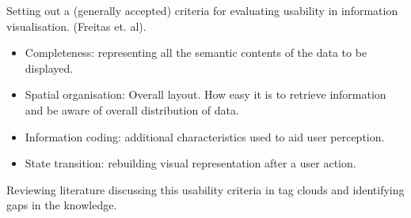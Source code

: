
Setting out a (generally accepted) criteria for evaluating usability in information visualisation. (Freitas et. al).

\begin{itemize}
	\item Completeness: representing all the semantic contents of the data to be displayed.
	\item Spatial organisation: Overall layout. How easy it is to retrieve information and be aware of overall distribution of data.
	\item Information coding: additional characteristics used to aid user perception.
	\item State transition: rebuilding visual representation after a user action. 
\end{itemize}

Reviewing literature discussing this usability criteria in tag clouds and identifying gaps in the knowledge.


